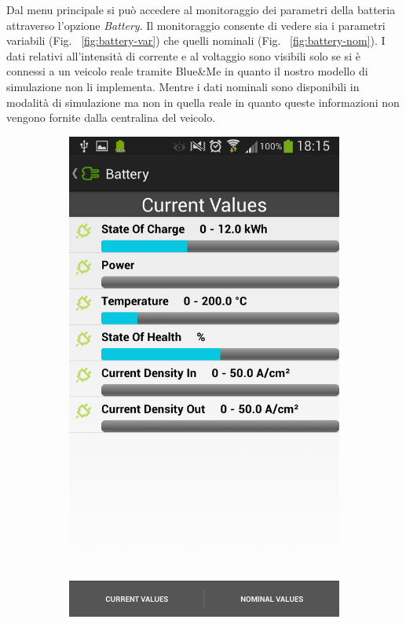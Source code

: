 Dal menu principale si può accedere al monitoraggio dei parametri della batteria attraverso l'opzione \emph{Battery}. Il monitoraggio consente di vedere sia i parametri variabili (Fig. ~\ref{fig:battery-var}) che quelli nominali (Fig. ~\ref{fig:battery-nom}). I dati relativi all'intensità di corrente e al voltaggio sono visibili solo se si è connessi a un veicolo reale tramite Blue\&{}Me in quanto il nostro modello di simulazione non li implementa. Mentre i dati nominali sono disponibili in modalità di simulazione ma non in quella reale in quanto queste informazioni non vengono fornite dalla centralina del veicolo.

\begin{figure}
	\centering
	\begin{subfigure}{0.45\textwidth}
		\includegraphics[width=\textwidth]{assets/mobile-app-battery-var.png}

\end{subfigure}
\end{figure}
